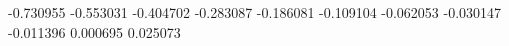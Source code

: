 -0.730955
-0.553031
-0.404702
-0.283087
-0.186081
-0.109104
-0.062053
-0.030147
-0.011396
0.000695
0.025073
